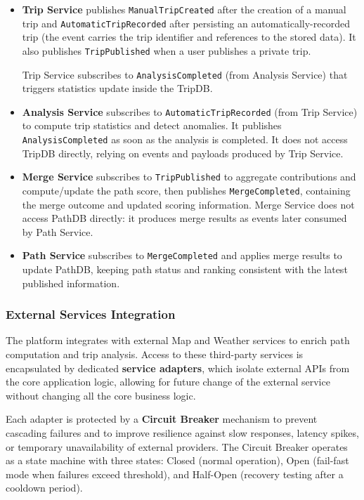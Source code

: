 \begin{itemize}
    \item \textbf{Trip Service} publishes \texttt{ManualTripCreated} after the creation of a manual trip and \texttt{AutomaticTripRecorded} after persisting an automatically-recorded trip (the event carries the trip identifier and references to the stored data). It also publishes \texttt{TripPublished} when a user publishes a private trip.
    
    Trip Service subscribes to \texttt{AnalysisCompleted} (from Analysis Service) that triggers statistics update inside the TripDB.
    
    \item \textbf{Analysis Service} subscribes to \texttt{AutomaticTripRecorded} (from Trip Service) to compute trip statistics and detect anomalies. It publishes \texttt{AnalysisCompleted} as soon as the analysis is completed. It does not access TripDB directly, relying on events and payloads produced by Trip Service.
    
    \item \textbf{Merge Service} subscribes to \texttt{TripPublished} to aggregate contributions and compute/update the path score, then publishes \texttt{MergeCompleted}, containing the merge outcome and updated scoring information. Merge Service does not access PathDB directly: it produces merge results as events later consumed by Path Service.
    
    \item \textbf{Path Service} subscribes to \texttt{MergeCompleted} and applies merge results to update PathDB, keeping path status and ranking consistent with the latest published information.
\end{itemize}

\subsubsection{External Services Integration}
The platform integrates with external Map and Weather services to enrich path computation and trip analysis. Access to these third-party services is encapsulated by dedicated \textbf{service adapters}, which isolate external APIs from the core application logic, allowing for future change of the external service without changing all the core business logic.

Each adapter is protected by a \textbf{Circuit Breaker} mechanism to prevent cascading failures and to improve resilience against slow responses, latency spikes, or temporary unavailability of external providers. The Circuit Breaker operates as a state machine with three states: Closed (normal operation), Open (fail-fast mode when failures exceed threshold), and Half-Open (recovery testing after a cooldown period).

